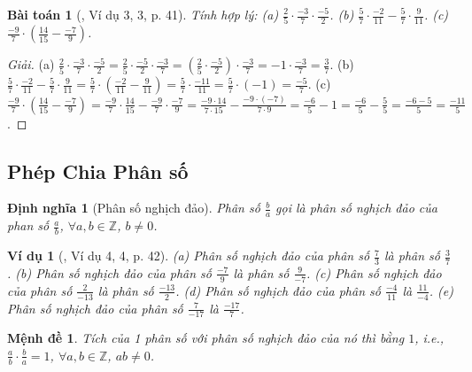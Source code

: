 \documentclass{article}
\newtheorem{baitoan}{Bài toán}
\newtheorem{dinhnghia}{Định nghĩa}
\newtheorem{menhde}{Mệnh đề}
\newtheorem{vidu}{Ví dụ}
\begin{document}
\begin{baitoan}[\cite{SGK_Toan_6_Canh_Dieu_tap_2}, Ví dụ 3, 3, p. 41]
	Tính hợp lý: (a) $\frac{2}{5}\cdot\frac{-3}{7}\cdot\frac{-5}{2}$. (b) $\frac{5}{7}\cdot\frac{-2}{11} - \frac{5}{7}\cdot\frac{9}{11}$. (c) $\frac{-9}{7}\cdot\left(\frac{14}{15} - \frac{-7}{9}\right)$.
\end{baitoan}

\begin{proof}[Giải]
	(a) $\frac{2}{5}\cdot\frac{-3}{7}\cdot\frac{-5}{2} = \frac{2}{5}\cdot\frac{-5}{2}\cdot\frac{-3}{7} = \left(\frac{2}{5}\cdot\frac{-5}{2}\right)\cdot\frac{-3}{7} = -1\cdot\frac{-3}{7} = \frac{3}{7}$. (b) $\frac{5}{7}\cdot\frac{-2}{11} - \frac{5}{7}\cdot\frac{9}{11} = \frac{5}{7}\cdot\left(\frac{-2}{11} - \frac{9}{11}\right) = \frac{5}{7}\cdot\frac{-11}{11} = \frac{5}{7}\cdot(-1) = \frac{-5}{7}$. (c) $\frac{-9}{7}\cdot\left(\frac{14}{15} - \frac{-7}{9}\right) = \frac{-9}{7}\cdot\frac{14}{15} - \frac{-9}{7}\cdot\frac{-7}{9} = \frac{-9\cdot14}{7\cdot15} - \frac{-9\cdot(-7)}{7\cdot9} = \frac{-6}{5} - 1 = \frac{-6}{5} - \frac{5}{5} = \frac{-6 - 5}{5} = \frac{-11}{5}$.
\end{proof}

\subsection{Phép Chia Phân số}

\begin{dinhnghia}[Phân số nghịch đảo]
	Phân số $\frac{b}{a}$ gọi là \emph{phân số nghịch đảo} của phan số $\frac{a}{b}$, $\forall a,b\in\mathbb{Z}$, $b\ne0$.
\end{dinhnghia}

\begin{vidu}[\cite{SGK_Toan_6_Canh_Dieu_tap_2}, Ví dụ 4, 4, p. 42]
	(a) Phân số nghịch đảo của phân số $\frac{7}{3}$ là phân số $\frac{3}{7}$. (b) Phân số nghịch đảo của phân số $\frac{-7}{9}$ là phân số $\frac{9}{-7}$. (c) Phân số nghịch đảo của phân số $\frac{2}{-13}$ là phân số $\frac{-13}{2}$. (d) Phân số nghịch đảo của phân số $\frac{-4}{11}$ là $\frac{11}{-4}$. (e) Phân số nghịch đảo của phân số $\frac{7}{-17}$ là $\frac{-17}{7}$.
\end{vidu}

\begin{menhde}
	Tích của 1 phân số với phân số nghịch đảo của nó thì bằng $1$, i.e., $\frac{a}{b}\cdot\frac{b}{a} = 1$, $\forall a,b\in\mathbb{Z}$, $ab\ne0$.
\end{menhde}
\end{document}

